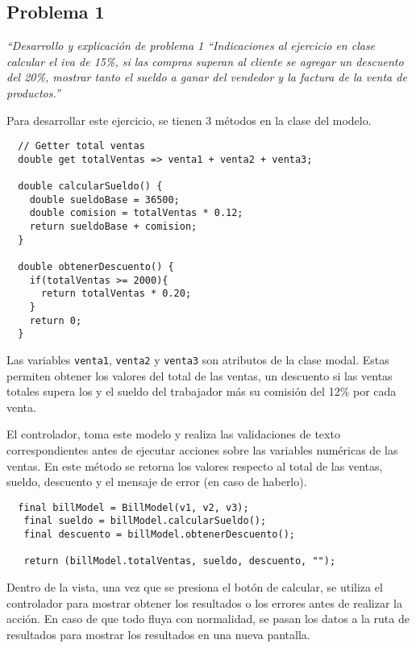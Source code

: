 \subsection{Problema 1}

\textit {“Desarrollo y explicación de problema 1 “Indicaciones al ejercicio en clase calcular el iva de 15\%, si las compras superan  al cliente se agregar un descuento del 20\%, mostrar tanto el sueldo a ganar del vendedor y la factura de la venta de productos.”}

Para desarrollar este ejercicio, se tienen 3 métodos en la clase del modelo.

\begin{center}
\begin{lstlisting}
  // Getter total ventas
  double get totalVentas => venta1 + venta2 + venta3;

  double calcularSueldo() {
    double sueldoBase = 36500;
    double comision = totalVentas * 0.12;
    return sueldoBase + comision;
  }

  double obtenerDescuento() {
    if(totalVentas >= 2000){
      return totalVentas * 0.20;
    }
    return 0;
  }
\end{lstlisting}
\end{center}

Las variables \lstinline{venta1}, \lstinline{venta2} y \lstinline{venta3} son atributos de la clase modal. Estas permiten obtener los valores del total de las ventas, un descuento si las ventas totales supera los  y el sueldo del trabajador más su comisión del 12\% por cada venta.

El controlador, toma este modelo y realiza las validaciones de texto correspondientes antes de ejecutar acciones sobre las variables numéricas de las ventas. En este método se retorna los valores respecto al total de las ventas, sueldo, descuento y el mensaje de error (en caso de haberlo).

\begin{center}
\begin{lstlisting}
  final billModel = BillModel(v1, v2, v3);
   final sueldo = billModel.calcularSueldo();
   final descuento = billModel.obtenerDescuento();

   return (billModel.totalVentas, sueldo, descuento, "");
\end{lstlisting}
\end{center}

Dentro de la vista, una vez que se presiona el botón de calcular, se utiliza el controlador para mostrar obtener los resultados o los errores antes de realizar la acción. En caso de que todo fluya con normalidad, se pasan los datos a la ruta de resultados para mostrar los resultados en una nueva pantalla.

